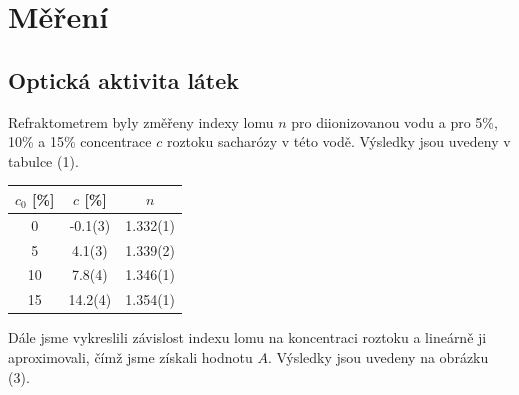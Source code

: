 \documentclass[a4paper,11pt]{article}
\begin{document}
\newpage
    \begin{minipage}[t]{0.5\textwidth} 
        \section{Měření}  
            \subsection{Optická aktivita látek}
                Refraktometrem byly změřeny indexy lomu $n$ pro diionizovanou vodu a pro 5\%, 10\% a 15\% concentrace $c$ roztoku sacharózy v této vodě. Výsledky jsou uvedeny v tabulce (1).  
                \vspace{10pt}
                \par \centering
                \begin{tabular}{|c|c|c|}
                    \hline
                    $c_0$ [\%] & $c$ [\%] & $n$ \\
                    \hline
                    0 & -0.1(3) & 1.332(1) \\
                    \hline
                    5 & 4.1(3) & 1.339(2) \\
                    \hline
                    10 & 7.8(4) & 1.346(1) \\
                    \hline
                    15 & 14.2(4) & 1.354(1) \\
                    \hline
                \end{tabular}
                \captionsetup{justification=centering, font=footnotesize}
                \vspace{10pt}
                \raggedright
                \par Dále jsme vykreslili závislost indexu lomu na koncentraci roztoku a lineárně ji aproximovali, čímž jsme získali hodnotu $A$. Výsledky jsou uvedeny na obrázku (3). 
                \vspace{10pt}
                \par \centering

\end{minipage}
\end{document}
